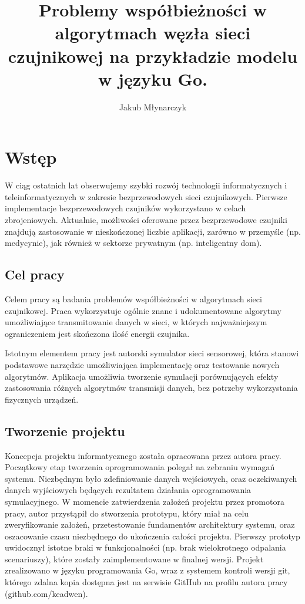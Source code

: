 \documentclass[a4paper,12pt,twoside,openany]{report}
\title{Problemy współbieżności w algorytmach węzła sieci czujnikowej na przykładzie modelu w języku Go.}
\author{Jakub Młynarczyk}
\begin{document}
\maketitle

\chapter{Wstęp}

W ciąg ostatnich lat obserwujemy szybki rozwój technologii informatycznych i teleinformatycznych w zakresie bezprzewodowych sieci czujnikowych.
Pierwsze implementacje bezprzewodowych czujników wykorzystano w celach zbrojeniowych. Aktualnie, możliwości oferowane przez bezprzewodowe 
czujniki znajdują zastosowanie w nieskończonej liczbie aplikacji, zarówno w przemyśle (np. medycynie), jak również w sektorze prywatnym (np. inteligentny dom).


\section{Cel pracy}
Celem pracy są badania problemów współbieżności w algorytmach sieci czujnikowej. Praca wykorzystuje 
ogólnie znane i udokumentowane algorytmy umożliwiające transmitowanie danych w sieci, w których najważniejszym ograniczeniem jest skończona ilość energii czujnika.

Istotnym elementem pracy jest autorski symulator sieci sensorowej, która stanowi podstawowe narzędzie umożliwiająca implementację oraz testowanie nowych algorytmów.
Aplikacja umożliwia tworzenie symulacji porównujących efekty zastosowania różnych algorytmów transmisji danych, bez potrzeby wykorzystania fizycznych urządzeń.

\section{Tworzenie projektu}
Koncepcja projektu informatycznego została opracowana przez autora pracy. Początkowy etap tworzenia oprogramowania polegał na zebraniu wymagań systemu.
Niezbędnym było zdefiniowanie danych wejściowych, oraz oczekiwanych danych wyjściowych będących rezultatem działania oprogramowania symulacyjnego.
W momencie zatwierdzenia założeń projektu przez promotora pracy, autor przystąpił do stworzenia prototypu, który miał na celu zweryfikowanie założeń, przetestowanie fundamentów architektury systemu, 
oraz oszacowanie czasu niezbędnego do ukończenia całości projektu. Pierwszy prototyp uwidocznył istotne braki w funkcjonalności (np. brak wielokrotnego odpalania scenariuszy), które zostały
zaimplementowane w finalnej wersji. Projekt zrealizowano w języku programowania Go, wraz z systemem kontroli wersji git, którego zdalna kopia dostępna jest na serwisie GitHub
na profilu autora pracy (github.com/keadwen).
\end{document}
